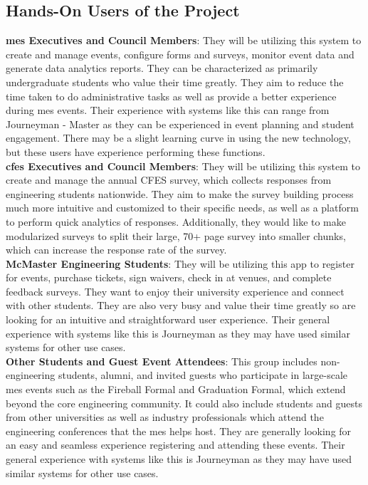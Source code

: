\documentclass[12pt]{article}
\begin{document}
\subsection{Hands-On Users of the Project}
\textbf{\gls{mes} Executives and Council Members}: They will be utilizing this system to create and manage events,
configure forms and surveys, monitor event data and generate data analytics reports. They can be characterized as
primarily undergraduate students who value their time greatly. They aim to reduce the time taken to do administrative
tasks as well as provide a better experience during \gls{mes} events. Their experience with systems like this can range
from Journeyman - Master as they can be experienced in event planning and student engagement. There may be a slight
learning curve in using the new technology, but these users have experience performing these functions.\\
\newline
\textbf{\gls{cfes} Executives and Council Members}: They will be utilizing this system to create and manage the annual CFES survey,
which collects responses from engineering students nationwide. They aim to make the survey building process much more intuitive and customized to
 their specific needs, as well as a platform to perform quick analytics of responses. Additionally, they would like to make modularized surveys to 
split their large, 70+ page survey into smaller chunks, which can increase the response rate of the survey. \\
\newline
\textbf{McMaster Engineering Students}: They will be utilizing this app to register for events, purchase tickets, sign
waivers, check in at venues, and complete feedback surveys. They want to enjoy their university experience and connect
with other students. They are also very busy and value their time greatly so are looking for an intuitive and
straightforward user experience. Their general experience with systems like this is Journeyman as they may have used
similar systems for other use cases. \\
\newline
\textbf{Other Students and Guest Event Attendees}: This group includes non-engineering students, alumni, and invited
guests who participate in large-scale \gls{mes} events such as the Fireball Formal and Graduation Formal, which extend
beyond the core engineering community. It could also include students and guests from other universities as well as
industry professionals which attend the engineering conferences that the \gls{mes} helps host. They are generally looking for an easy
and seamless experience registering and attending these events. Their general experience with systems like this is
Journeyman as they may have used similar systems for other use cases.
\end{document}
